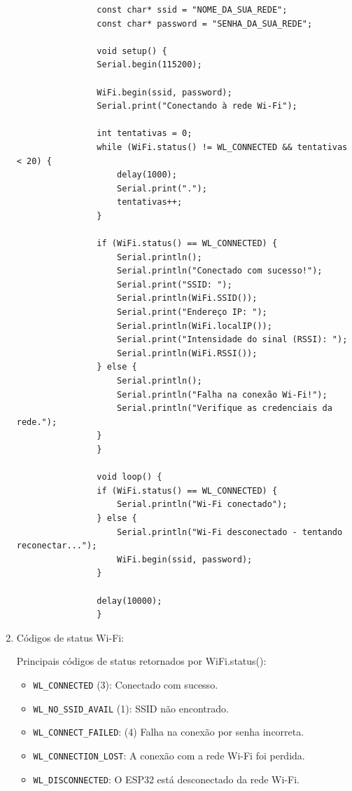 \documentclass[a4paper]{article}
\begin{document}
\begin{answer}
\begin{enumerate}
\begin{verbatim}
                const char* ssid = "NOME_DA_SUA_REDE";
                const char* password = "SENHA_DA_SUA_REDE";

                void setup() {
                Serial.begin(115200);

                WiFi.begin(ssid, password);
                Serial.print("Conectando à rede Wi-Fi");

                int tentativas = 0;
                while (WiFi.status() != WL_CONNECTED && tentativas < 20) {
                    delay(1000);
                    Serial.print(".");
                    tentativas++;
                }

                if (WiFi.status() == WL_CONNECTED) {
                    Serial.println();
                    Serial.println("Conectado com sucesso!");
                    Serial.print("SSID: ");
                    Serial.println(WiFi.SSID());
                    Serial.print("Endereço IP: ");
                    Serial.println(WiFi.localIP());
                    Serial.print("Intensidade do sinal (RSSI): ");
                    Serial.println(WiFi.RSSI());
                } else {
                    Serial.println();
                    Serial.println("Falha na conexão Wi-Fi!");
                    Serial.println("Verifique as credenciais da rede.");
                }
                }

                void loop() {
                if (WiFi.status() == WL_CONNECTED) {
                    Serial.println("Wi-Fi conectado");
                } else {
                    Serial.println("Wi-Fi desconectado - tentando reconectar...");
                    WiFi.begin(ssid, password);
                }

                delay(10000);
                }
            \end{verbatim}
        
            \item Códigos de status Wi-Fi:

                Principais códigos de status retornados por WiFi.status():
                    \begin{itemize}
                        \item \texttt{WL\_CONNECTED} (3): Conectado com sucesso.
                        \item \texttt{WL\_NO\_SSID\_AVAIL} (1): SSID não encontrado.
                        \item \texttt{WL\_CONNECT\_FAILED}: (4) Falha na conexão por senha incorreta.   
                        \item \texttt{WL\_CONNECTION\_LOST}: A conexão com a rede Wi-Fi foi perdida.
                        \item \texttt{WL\_DISCONNECTED}: O ESP32 está desconectado da rede Wi-Fi.
                    \end{itemize}
            

\end{enumerate}
\end{answer}
\end{document}
